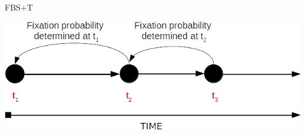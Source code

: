 \documentclass{beamer}
\newcommand{\code}[1]{\texttt{#1}}
\begin{document}
%
%
%
%
%


\begin{frame}{FBS+T}
\begin{center}
\includegraphics[scale=0.45]{img/occulomotor_delay_1.png}
\end{center}
\end{frame}
\end{document}
